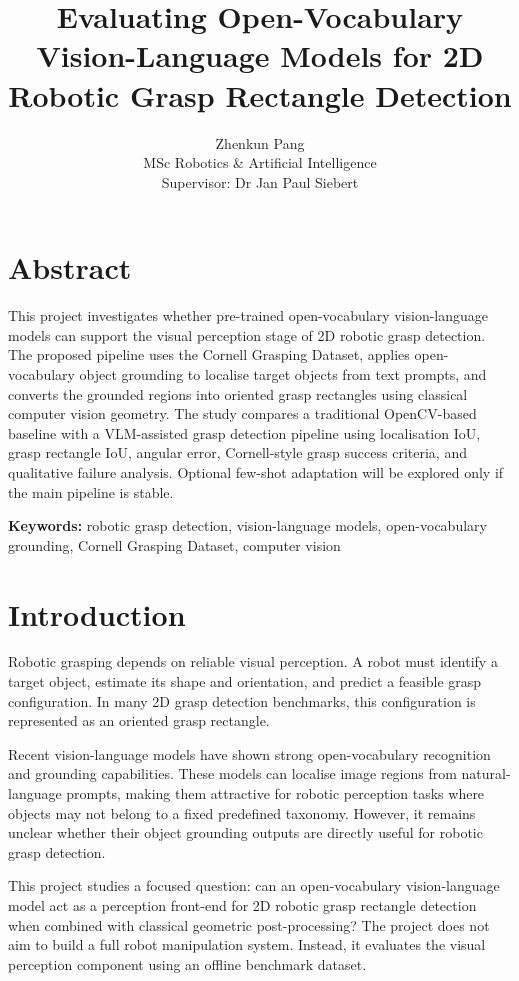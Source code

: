 \documentclass[11pt,a4paper]{article}
\title{\sffamily\bfseries\LARGE Evaluating Open-Vocabulary Vision-Language Models for 2D Robotic Grasp Rectangle Detection}
\author{
Zhenkun Pang\\
\small MSc Robotics \& Artificial Intelligence\\
\small Supervisor: Dr Jan Paul Siebert
}
\date{}
\begin{document}
\maketitle

\section*{Abstract}
\noindent\colorbox{abstractblue}{%
\parbox{\dimexpr\linewidth-2\fboxsep\relax}{%
This project investigates whether pre-trained open-vocabulary vision-language models can support the visual perception stage of 2D robotic grasp detection. The proposed pipeline uses the Cornell Grasping Dataset, applies open-vocabulary object grounding to localise target objects from text prompts, and converts the grounded regions into oriented grasp rectangles using classical computer vision geometry. The study compares a traditional OpenCV-based baseline with a VLM-assisted grasp detection pipeline using localisation IoU, grasp rectangle IoU, angular error, Cornell-style grasp success criteria, and qualitative failure analysis. Optional few-shot adaptation will be explored only if the main pipeline is stable.
}}

\vspace{1em}
\noindent\textbf{Keywords:} robotic grasp detection, vision-language models, open-vocabulary grounding, Cornell Grasping Dataset, computer vision

\section{Introduction}

Robotic grasping depends on reliable visual perception. A robot must identify a target object, estimate its shape and orientation, and predict a feasible grasp configuration. In many 2D grasp detection benchmarks, this configuration is represented as an oriented grasp rectangle.

Recent vision-language models have shown strong open-vocabulary recognition and grounding capabilities. These models can localise image regions from natural-language prompts, making them attractive for robotic perception tasks where objects may not belong to a fixed predefined taxonomy. However, it remains unclear whether their object grounding outputs are directly useful for robotic grasp detection.

This project studies a focused question: can an open-vocabulary vision-language model act as a perception front-end for 2D robotic grasp rectangle detection when combined with classical geometric post-processing? The project does not aim to build a full robot manipulation system. Instead, it evaluates the visual perception component using an offline benchmark dataset.
\end{document}

